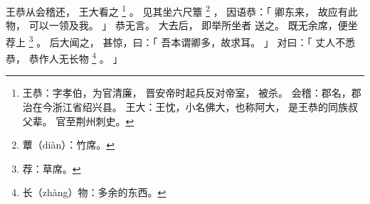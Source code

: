
\switchcolumn*[\section{}]

王恭从会稽还，
王大看之%
\footnote{%
    王恭：字孝伯，为官清廉，
          晋安帝时起兵反对帝室，
          被杀。
    会稽：郡名，郡治在今浙江省绍兴县。
    王大：王忱，小名佛大，也称阿大，
          是王恭的同族叔父辈。
          官至荆州刺史。
}%
。
见其坐六尺簟%
\footnote{%
    蕈（diàn）：竹席。
}%
，
因语恭：「
    卿东来，
    故应有此物，
    可以一领及我。
」
恭无言。
大去后，
即举所坐者
送之。
既无余席，便坐荐上%
\footnote{%
    荐：草席。
}%
。
后大闻之，
甚惊，曰：「
    吾本谓卿多，故求耳。
」
对曰：「
    丈人不悉恭，
    恭作人无长物%
    \footnote{%
        长（zhàng）物：多余的东西。
    }%
    。
」

\switchcolumn


